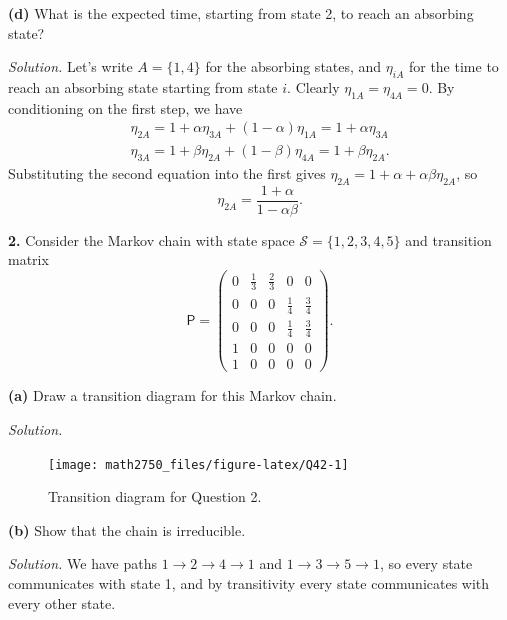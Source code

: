 \documentclass[
  a4paper,
]{article}
\theoremstyle{definition}
\theoremstyle{definition}
\theoremstyle{definition}
\theoremstyle{remark}
\begin{document}
\textbf{(d)} What is the expected time, starting from state 2, to reach an absorbing state?

\begin{myanswers}
\emph{Solution.} Let's write \(A = \{1,4\}\) for the absorbing states, and \(\eta_{iA}\) for the time to reach an absorbing state starting from state \(i\). Clearly \(\eta_{1A} = \eta_{4A} = 0\). By conditioning on the first step, we have
\begin{gather*}
    \eta_{2A} = 1 + \alpha \eta_{3A} + (1-\alpha) \eta_{1A} = 1 + \alpha \eta_{3A}  \\
    \eta_{3A} = 1 + \beta \eta_{2A} + (1-\beta) \eta_{4A} = 1+\beta \eta_{2A} .
    \end{gather*}
Substituting the second equation into the first gives
\(\eta_{2A}= 1 + \alpha + \alpha\beta \eta_{2A}\), so
\[ \eta_{2A} = \frac{1+\alpha}{1-\alpha\beta}  . \]

\end{myanswers}

\textbf{2.}
Consider the Markov chain with state space \(\mathcal S = \{1,2,3,4,5\}\) and transition matrix
\[ \mathsf P = \begin{pmatrix} 0 & \frac13 & \frac23 & 0 & 0 \\
                0 & 0 & 0 & \frac14 & \frac34 \\
                0 & 0 & 0 & \frac14 & \frac34 \\
                1 & 0 & 0 & 0 & 0 \\
                1 & 0 & 0 & 0 & 0 \end{pmatrix} . \]

\textbf{(a)} Draw a transition diagram for this Markov chain.

\begin{myanswers}

\emph{Solution.}

\begin{figure}

{\centering \texttt{[image: math2750\_files/figure-latex/Q42-1]} 

}

\caption{Transition diagram for Question 2.}\label{fig:Q42}
\end{figure}

\end{myanswers}

\textbf{(b)} Show that the chain is irreducible.

\begin{myanswers}
\emph{Solution.} We have paths \(1 \to 2 \to 4 \to 1\) and \(1 \to 3 \to 5 \to 1\), so every state communicates with state 1, and by transitivity every state communicates with every other state.

\end{myanswers}
\end{document}
